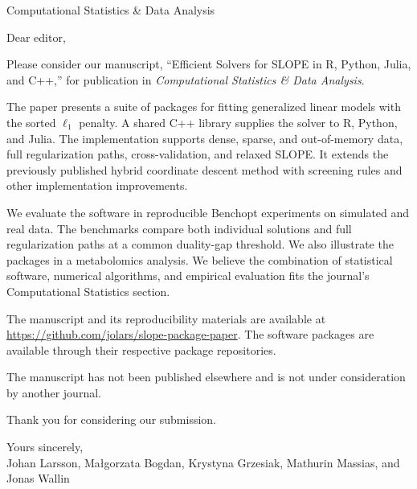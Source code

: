 \documentclass[english,a4paper,12pt]{letter}
\begin{document}
\begin{letter}{Computational Statistics \& Data Analysis}
  \opening{Dear editor,}

  Please consider our manuscript, ``Efficient Solvers for SLOPE in R, Python,
  Julia, and C++,'' for publication in \emph{Computational Statistics \& Data
  Analysis}.

  The paper presents a suite of packages for fitting generalized linear models
  with the sorted $\ell_1$ penalty. A shared C++ library supplies the solver to
  R, Python, and Julia. The implementation supports dense, sparse, and
  out-of-memory data, full regularization paths, cross-validation, and relaxed
  SLOPE\@. It extends the previously published hybrid coordinate descent method
  with screening rules and other implementation improvements.

  We evaluate the software in reproducible Benchopt experiments on simulated and
  real data. The benchmarks compare both individual solutions and full
  regularization paths at a common duality-gap threshold. We also illustrate the
  packages in a metabolomics analysis. We believe the combination of statistical
  software, numerical algorithms, and empirical evaluation fits the journal's
  Computational Statistics section.

  The manuscript and its reproducibility materials are available at
  \url{https://github.com/jolars/slope-package-paper}. The software packages are
  available through their respective package repositories.

  The manuscript has not been published elsewhere and is not under consideration
  by another journal.

  Thank you for considering our submission.

  \closing{Yours sincerely,\\[1ex] Johan Larsson, Ma\l{}gorzata Bogdan, Krystyna
    Grzesiak, Mathurin Massias, and Jonas Wallin
  }

\end{letter}
\end{document}
